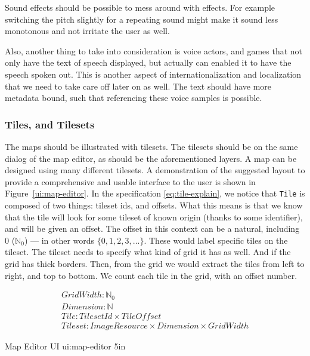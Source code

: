 Sound effects should be possible to mess around with effects. For example
switching the pitch slightly for a repeating sound might make it sound less
monotonous and not irritate the user as well.

Also, another thing to take into consideration is voice actors, and games that
not only have the text of speech displayed, but actually can enabled it to have
the speech spoken out. This is another aspect of internationalization and
localization that we need to take care off later on as well. The text should
have more metadata bound, such that referencing these voice samples is possible.

\subsubsection{Tiles, and Tilesets}

The maps should be illustrated with tilesets. The tilesets should be on the
same dialog of the map editor, as should be the aforementioned layers. A map
can be designed using many different tilesets. A demonstration of the
suggested layout to provide a comprehensive and usable interface to the user
is shown in Figure~\ref{ui:map-editor}. In the specification
\ref{eq:tile-explain}, we notice that \texttt{Tile} is composed of two things:
tileset ids, and offsets. What this means is that we know that the tile will
look for some tileset of known origin (thanks to some identifier), and will be
given an offset. The offset in this context can be a natural, including 0
($\mathbb{N}_0$) --- in other words $\{ 0, 1, 2, 3, ... \}$. These would label
specific tiles on the tileset. The tileset needs to specify what kind of grid
it has as well. And if the grid has thick borders. Then, from the grid we would
extract the tiles from left to right, and top to bottom. We count each tile in
the grid, with an offset number.

\begin{equation}
  \begin{split} \label{eq:tile-explain}
  GridWidth\colon \mathbb{N}_0 \\
  Dimension\colon \mathbb{N} \\
  Tile\colon TilesetId \times TileOffset \\
  Tileset\colon ImageResource \times Dimension \times GridWidth
\end{split}
\end{equation}

%
       {Map Editor UI}%
       {ui:map-editor}%
       {5in}

